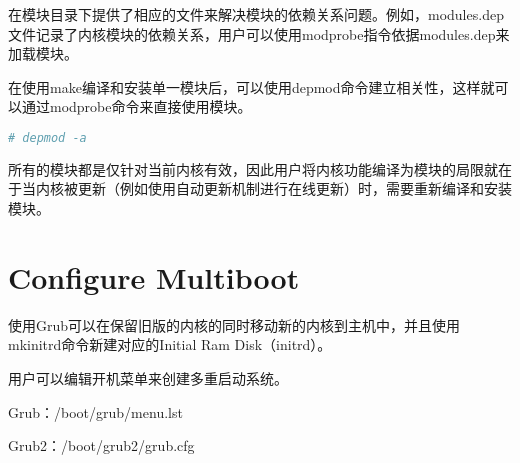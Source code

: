 在模块目录下提供了相应的文件来解决模块的依赖关系问题。例如，modules.dep文件记录了内核模块的依赖关系，用户可以使用modprobe指令依据modules.dep来加载模块。

在使用make编译和安装单一模块后，可以使用depmod命令建立相关性，这样就可以通过modprobe命令来直接使用模块。

\begin{lstlisting}[language=bash]
# depmod -a
\end{lstlisting}

所有的模块都是仅针对当前内核有效，因此用户将内核功能编译为模块的局限就在于当内核被更新（例如使用自动更新机制进行在线更新）时，需要重新编译和安装模块。


\section{Configure Multiboot}

使用Grub可以在保留旧版的内核的同时移动新的内核到主机中，并且使用mkinitrd命令新建对应的Initial Ram Disk（initrd）。

用户可以编辑开机菜单来创建多重启动系统。

\begin{compactitem}
\item Grub：/boot/grub/menu.lst
\item Grub2：/boot/grub2/grub.cfg
\end{compactitem}





































